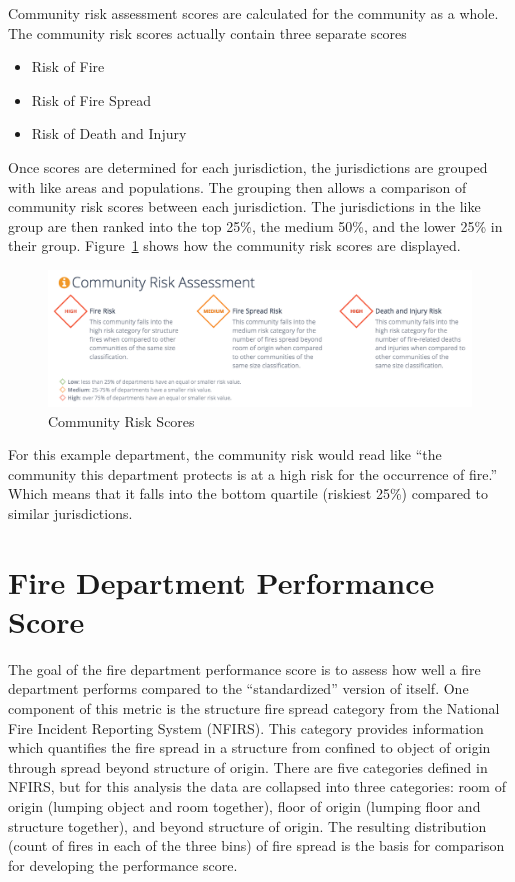 \documentclass[12pt,oneside]{book}
\begin{document}
Community risk assessment scores are calculated for the community as a whole. The community risk scores actually contain three separate scores 

\begin{itemize}
\item Risk of Fire
\item Risk of Fire Spread
\item Risk of Death and Injury
\end{itemize}

Once scores are determined for each jurisdiction, the jurisdictions are grouped with like areas and populations.  The grouping then allows a comparison of community risk scores between each jurisdiction.  The jurisdictions in the like group are then ranked into the top 25\%, the medium 50\%, and the lower 25\% in their group. Figure~\ref{fig:risk} shows how the community risk scores are displayed.

\begin{figure}[ht!]
\centering
\includegraphics[width=.9\columnwidth]{Figures/risk}
\caption{Community Risk Scores}
\label{fig:risk}
\end{figure}

For this example department, the community risk would read like ``the community this department protects is at a high risk for the occurrence of fire.'' Which means that it falls into the bottom quartile (riskiest 25\%) compared to similar jurisdictions.

\section{Fire Department Performance Score}

The goal of the fire department performance score is to assess how well a fire department performs compared to the ``standardized'' version of itself. One component of this metric is the structure fire spread category from the National Fire Incident Reporting System (NFIRS). This category provides information which quantifies the fire spread in a structure from confined to object of origin through spread beyond structure of origin. There are five categories defined in NFIRS, but for this analysis the data are collapsed into three categories: room of origin (lumping object and room together), floor of origin (lumping floor and structure together), and beyond structure of origin. The resulting distribution (count of fires in each of the three bins) of fire spread is the basis for comparison for developing the performance score.
\end{document}
